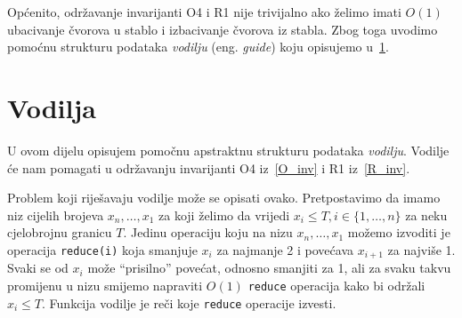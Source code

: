 Op\'{c}enito, odr\v{z}avanje invarijanti O4 i R1 nije trivijalno ako \v{z}elimo imati $O(1)$ ubacivanje \v{c}vorova u stablo i izbacivanje \v{c}vorova iz stabla.
Zbog toga uvodimo pomo\'{c}nu strukturu podataka \emph{vodilju} (eng. \emph{guide}) koju opisujemo u~\ref{vodilja}.

\section{Vodilja}\label{vodilja}
U ovom dijelu opisujem pomo\v{c}nu apstraktnu strukturu podataka \emph{vodilju}.
Vodilje \'{c}e nam pomagati u odr\v{z}avanju invarijanti O4 iz~\ref{O_inv} i R1 iz~\ref{R_inv}.

Problem koji rije\v{s}avaju vodilje mo\v{z}e se opisati ovako.
Pretpostavimo da imamo niz cijelih brojeva $x_{n},\dotsc,x_{1}$ za koji \v{z}elimo da vrijedi $x_{i} \le T, i \in \{1,\dotsc,n\}$ za neku cjelobrojnu granicu $T$.
Jedinu operaciju koju na nizu $x_{n},\dotsc,x_{1}$ mo\v{z}emo izvoditi je operacija \texttt{reduce(i)} koja smanjuje $x_{i}$ za najmanje 2 i pove\'{c}ava $x_{i+1}$ za najvi\v{s}e 1.
Svaki se od $x_{i}$ mo\v{z}e ``prisilno'' pove\'{c}at, odnosno smanjiti za 1, ali za svaku takvu promijenu u nizu smijemo napraviti $O(1)$ \texttt{reduce} operacija kako bi odr\v{z}ali $x_{i} \le T$.
Funkcija vodilje je re\v{c}i koje \texttt{reduce} operacije izvesti.

